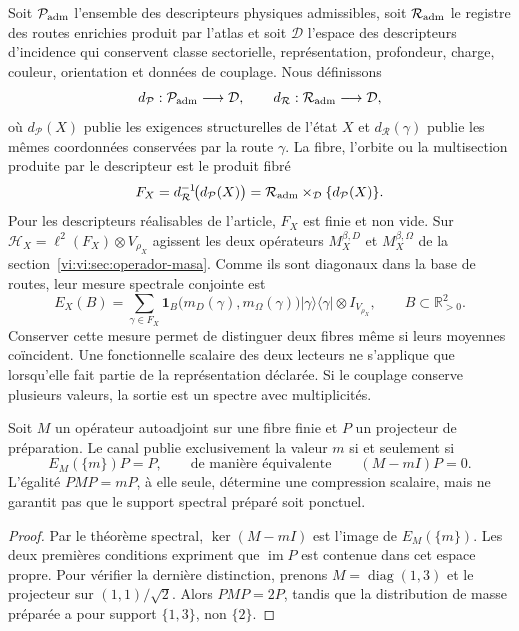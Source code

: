 Soit \(\mathcal P_{\rm adm}\) l’ensemble des descripteurs physiques admissibles,
soit \(\mathcal R_{\rm adm}\) le registre des routes enrichies produit par
l’atlas et soit \(\mathcal D\) l’espace des descripteurs d’incidence qui
conservent classe sectorielle, représentation, profondeur, charge, couleur,
orientation et données de couplage. Nous définissons
\[
 d_{\mathcal P}:\mathcal P_{\rm adm}\longrightarrow\mathcal D,
 \qquad
 d_{\mathcal R}:\mathcal R_{\rm adm}\longrightarrow\mathcal D,
\]
où \(d_{\mathcal P}(X)\) publie les exigences structurelles de l'état
\(X\) et \(d_{\mathcal R}(\gamma)\) publie les mêmes coordonnées conservées
par la route \(\gamma\). La fibre, l'orbite ou la multisection produite par le
descripteur est le produit fibré
\begin{equation}
 F_X=d_{\mathcal R}^{-1}\!\bigl(d_{\mathcal P}(X)\bigr)
 =\mathcal R_{\rm adm}\times_{\mathcal D}\{d_{\mathcal P}(X)\}.
 \label{vi:vi:eq:fibra-descriptor}
\end{equation}
Pour les descripteurs réalisables de l’article, \(F_X\) est finie et non vide.
Sur
\(\mathcal H_X=\ell^2(F_X)\otimes V_{\rho_X}\) agissent les deux opérateurs
\(M_X^{\beta,D}\) et \(M_X^{\beta,\Omega}\) de la
section~\ref{vi:vi:sec:operador-masa}. Comme ils sont diagonaux dans la base de
routes, leur mesure spectrale conjointe est
\begin{equation}
 E_X(B)=\sum_{\gamma\in F_X}
 \mathbf1_B\bigl(m_D(\gamma),m_\Omega(\gamma)\bigr)
 |\gamma\rangle\langle\gamma|\otimes I_{V_{\rho_X}},
 \qquad B\subset\mathbb R_{>0}^2.
 \label{vi:vi:eq:familias-pvm}
\end{equation}
Conserver cette mesure permet de distinguer deux fibres même si leurs moyennes
coïncident. Une fonctionnelle scalaire des deux lecteurs ne s’applique que
lorsqu’elle fait partie de la représentation déclarée. Si le couplage
conserve plusieurs valeurs, la sortie est un spectre avec multiplicités.

\begin{proposition}
\label{vi:vi:prop:familias-linea}
Soit \(M\) un opérateur autoadjoint sur une fibre finie et \(P\) un
projecteur de préparation. Le canal publie exclusivement la valeur \(m\)
si et seulement si
\[
 E_M(\{m\})P=P,
 \qquad\text{de manière équivalente}\qquad (M-mI)P=0.
\]
L’égalité \(PMP=mP\), à elle seule, détermine une compression scalaire,
mais ne garantit pas que le support spectral préparé soit ponctuel.
\end{proposition}
\begin{proof}
Par le théorème spectral, \(\ker(M-mI)\) est l’image de
\(E_M(\{m\})\). Les deux premières conditions expriment que
\(\operatorname{im}P\) est contenue dans cet espace propre. Pour vérifier
la dernière distinction, prenons \(M=\operatorname{diag}(1,3)\) et le projecteur
sur \((1,1)/\sqrt2\). Alors \(PMP=2P\), tandis que la distribution
de masse préparée a pour support \(\{1,3\}\), non \(\{2\}\).
\end{proof}

